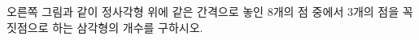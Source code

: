 \noindent\begin{minipage}[t]{0.58\linewidth}\vspace{0pt}\raggedright 오른쪽 그림과 같이 정사각형 위에 같은 간격으로 놓인 8개의 점 중에서 3개의 점을 꼭짓점으로 하는 삼각형의 개수를 구하시오.\end{minipage}\hfill\begin{minipage}[t]{0.4\linewidth}\vspace{0pt}\centering \resizebox{\ifdim\width>\linewidth\linewidth\else\width\fi}{!}{}\end{minipage}\par
